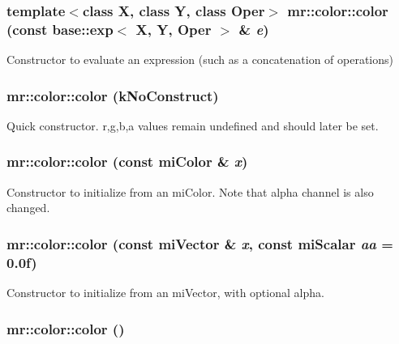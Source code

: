 \subsubsection{\setlength{\rightskip}{0pt plus 5cm}template$<$class X, class Y, class Oper$>$ mr::color::color (const {\bf base::exp}$<$ X, Y, Oper $>$ \& {\em e})\hspace{0.3cm}{\tt  [inline]}}\label{structmr_1_1color_z1_0}


Constructor to evaluate an expression (such as a concatenation of operations) 
\subsubsection{\setlength{\rightskip}{0pt plus 5cm}mr::color::color ({\bf k\-No\-Construct})\hspace{0.3cm}{\tt  [inline]}}\label{structmr_1_1color_z1_1}


Quick constructor. r,g,b,a values remain undefined and should later be set. 
\subsubsection{\setlength{\rightskip}{0pt plus 5cm}mr::color::color (const mi\-Color \& {\em x})\hspace{0.3cm}{\tt  [inline]}}\label{structmr_1_1color_z1_2}


Constructor to initialize from an mi\-Color. Note that alpha channel is also changed. 
\subsubsection{\setlength{\rightskip}{0pt plus 5cm}mr::color::color (const mi\-Vector \& {\em x}, const mi\-Scalar {\em aa} = 0.0f)\hspace{0.3cm}{\tt  [inline]}}\label{structmr_1_1color_z1_3}


Constructor to initialize from an mi\-Vector, with optional alpha. 

\subsubsection{\setlength{\rightskip}{0pt plus 5cm}mr::color::color ()\hspace{0.3cm}{\tt  [inline]}}\label{structmr_1_1color_z1_4}


